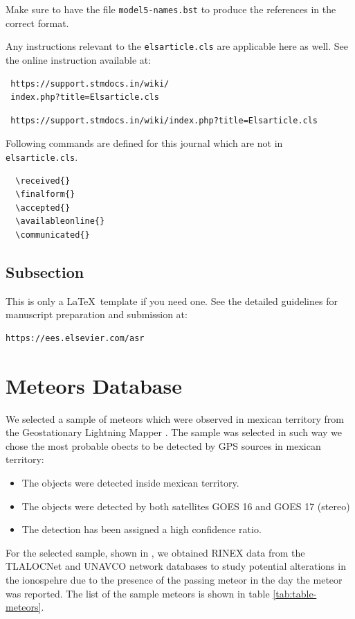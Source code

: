\documentclass[times,twocolumn,final,authoryear]{elsarticle}
\begin{document}
Make sure to have the file \verb+model5-names.bst+ to produce the references in
the correct format. 

Any instructions relevant to the \verb+elsarticle.cls+ are
applicable here as well. See the online instruction available at:
\makeatletter
\if@twocolumn
\begin{verbatim}
 https://support.stmdocs.in/wiki/
 index.php?title=Elsarticle.cls
\end{verbatim}
\else
\begin{verbatim}
 https://support.stmdocs.in/wiki/index.php?title=Elsarticle.cls
 \end{verbatim}
\fi
\makeatother

Following commands are defined for this journal which are not in
\verb+elsarticle.cls+. 
\begin{verbatim}
  \received{}
  \finalform{}
  \accepted{}
  \availableonline{}
  \communicated{}
\end{verbatim}


\subsection{Subsection}
This is only a \LaTeX\ template if you need one. 
See the detailed guidelines for manuscript preparation 
and submission at:
\begin{verbatim}
https://ees.elsevier.com/asr
\end{verbatim}

\section{Meteors Database}

We selected a sample of meteors which were observed in mexican territory from the Geostationary Lightning Mapper \citep{GOODMAN:2013}. The sample was selected in such way we chose the most probable obects to be detected by GPS sources in mexican territory: 

\begin{itemize}
    \item The objects were detected inside mexican territory.
    \item The objects were detected by both satellites GOES 16 and GOES 17 (stereo)
    \item The detection has been assigned a high confidence ratio.
\end{itemize}

 For the selected sample, shown in , we obtained RINEX data from the TLALOCNet and UNAVCO network databases \citep{Cabral-Cano:2018} to study potential alterations in the ionospehre due to the presence of the passing meteor in the day the meteor was reported. The list of the sample meteors is shown in table \ref{tab:table-meteors}.
\end{document}
